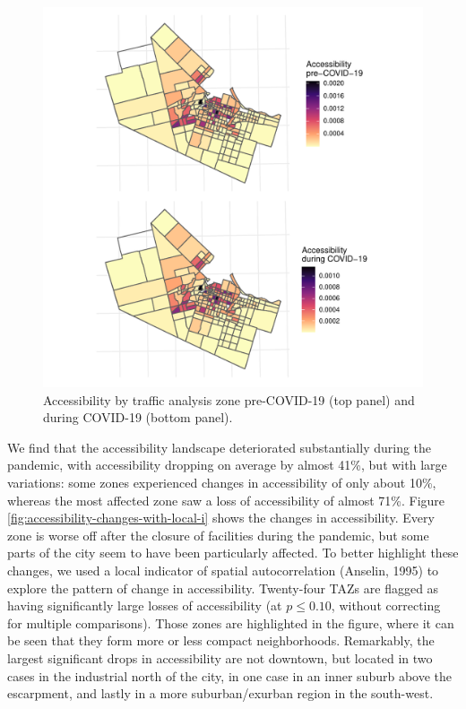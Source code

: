 \documentclass[]{elsarticle} %
\begin{document}
\begin{figure}

{\centering \includegraphics[width=1\linewidth]{Accessibility-Foodbanks-Hamilton-V0_files/figure-latex/plot-accessibility-1} 

}

\caption{\label{fig:accessibility}Accessibility by traffic analysis zone pre-COVID-19 (top panel) and during COVID-19 (bottom panel).}\label{fig:plot-accessibility}
\end{figure}

We find that the accessibility landscape deteriorated substantially
during the pandemic, with accessibility dropping on average by almost
41\%, but with large variations: some zones experienced changes in
accessibility of only about 10\%, whereas the most affected zone saw a
loss of accessibility of almost 71\%. Figure
\ref{fig:accessibility-changes-with-local-i} shows the changes in
accessibility. Every zone is worse off after the closure of facilities
during the pandemic, but some parts of the city seem to have been
particularly affected. To better highlight these changes, we used a
local indicator of spatial autocorrelation (Anselin, 1995) to explore
the pattern of change in accessibility. Twenty-four TAZs are flagged as
having significantly large losses of accessibility (at \(p\le 0.10\),
without correcting for multiple comparisons). Those zones are
highlighted in the figure, where it can be seen that they form more or
less compact neighborhoods. Remarkably, the largest significant drops in
accessibility are not downtown, but located in two cases in the
industrial north of the city, in one case in an inner suburb above the
escarpment, and lastly in a more suburban/exurban region in the
south-west.
\end{document}
